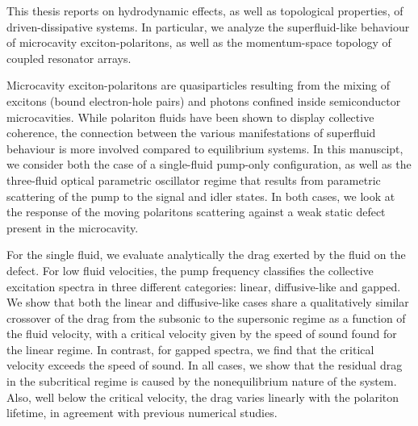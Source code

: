 This thesis reports on hydrodynamic effects, as well as topological
properties, of driven-dissipative systems. In particular, we analyze
the superfluid-like behaviour of microcavity exciton-polaritons, as
well as the momentum-space topology of coupled resonator arrays.

Microcavity exciton-polaritons are quasiparticles resulting from the
mixing of excitons (bound electron-hole pairs) and photons confined
inside semiconductor microcavities. While polariton fluids have been
shown to display collective coherence, the connection between the
various manifestations of superfluid behaviour is more involved
compared to equilibrium systems. In this manuscipt, we consider both
the case of a single-fluid pump-only configuration, as well as the
three-fluid optical parametric oscillator regime that results from
parametric scattering of the pump to the signal and idler states. In
both cases, we look at the response of the moving polaritons
scattering against a weak static defect present in the microcavity.

For the single fluid, we evaluate analytically the drag exerted by the
fluid on the defect. For low fluid velocities, the pump frequency
classifies the collective excitation spectra in three different
categories: linear, diffusive-like and gapped. We show that both the
linear and diffusive-like cases share a qualitatively similar
crossover of the drag from the subsonic to the supersonic regime as a
function of the fluid velocity, with a critical velocity given by the
speed of sound found for the linear regime. In contrast, for gapped
spectra, we find that the critical velocity exceeds the speed of
sound. In all cases, we show that the residual drag in the subcritical
regime is caused by the nonequilibrium nature of the system. Also,
well below the critical velocity, the drag varies linearly with the
polariton lifetime, in agreement with previous numerical studies.

